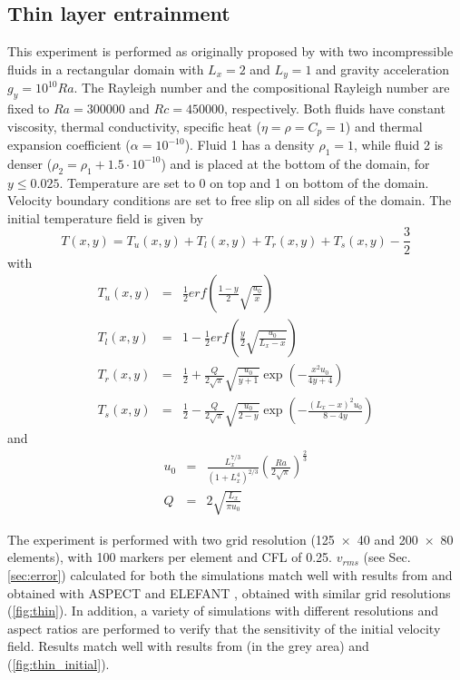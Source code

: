 \documentclass[hidelinks,11pt,a4paper]{article}
\begin{document}
\subsection{Thin layer entrainment}\label{sec:thin}
This experiment is performed as originally proposed by \citet{vanKeken1997} with two incompressible fluids in a rectangular domain with $L_x=2$ and $L_y=1$ and gravity acceleration $g_y=10^{10}Ra$. The Rayleigh number and the compositional Rayleigh number are fixed to $Ra=300000$ and $Rc=450000$, respectively. Both fluids have constant viscosity, thermal conductivity, specific heat ($\eta=\rho=C_p=1$) and thermal expansion coefficient ($\alpha=10^{-10}$). Fluid 1 has a density $\rho_1=1$, while fluid 2 is denser ($\rho_2=\rho_1+1.5 \cdot 10^{-10}$) and is placed at the bottom of the domain, for $y \leq 0.025$. Temperature are set to 0 on top and 1 on bottom of the domain. Velocity boundary conditions are set to free slip on all sides of the domain. The initial temperature field is given by
\[T(x,y)=T_u(x,y)+T_l(x,y)+T_r(x,y)+T_s(x,y)-\frac{3}{2}\]
with
\begin{eqnarray}
T_u(x,y)&=&\frac{1}{2}erf\left(\frac{1-y}{2}\sqrt{\frac{u_0}{x}}\right)\nonumber \\
T_l(x,y)&=&1-\frac{1}{2}erf\left(\frac{y}{2}\sqrt{\frac{u_0}{L_x-x}}\right)\nonumber \\
T_r(x,y)&=&\frac{1}{2}+\frac{Q}{2\sqrt{\pi}}\sqrt{\frac{u_0}{y+1}} \exp\left(-\frac{x^2u_0}{4y+4}\right)\nonumber \\
T_s(x,y)&=&\frac{1}{2}-\frac{Q}{2\sqrt{\pi}}\sqrt{\frac{u_0}{2-y}} \exp\left(-\frac{(L_x-x)^2u_0}{8-4y}\right)\nonumber
\end{eqnarray}
and
\begin{eqnarray}
u_0&=&\frac{L_x^{7/3}}{(1+L_x^4)^{2/3}}\left(\frac{Ra}{2\sqrt{\pi}}\right)^{\frac{2}{3}}\nonumber \\
Q&=&2\sqrt{\frac{L_x}{\pi u_0}}\nonumber
\end{eqnarray}

The experiment is performed with two grid resolution (\num{125x40} and \num{200x80} elements), with 100 markers per element and CFL of 0.25. $v_{rms}$ (see Sec. \ref{sec:error}) calculated for both the simulations match well with results from \citet{vanKeken1997} and obtained with ASPECT \citep{KHB12,heister_aspect_methods2,aspect-doi-v2.2.0,aspectmanual} and ELEFANT \citep{Thieulot2014}, obtained with similar grid resolutions (\ref{fig:thin}). In addition, a variety of simulations with different resolutions and aspect ratios are performed to verify that the sensitivity of the initial velocity field. Results match well with results from \citet{vanKeken1997} (in the grey area) and \citet{Thieulot2014} (\ref{fig:thin_initial}).
\end{document}
